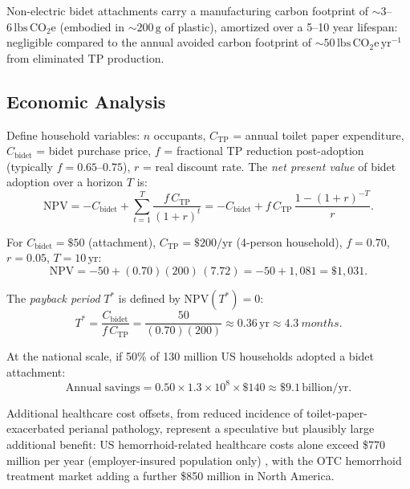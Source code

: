 \documentclass[aps,prfluids,reprint,amsmath,amssymb,floatfix]{revtex4-2}
\begin{document}
Non-electric bidet attachments carry a manufacturing carbon footprint of
$\sim\!3$--$6\,\mathrm{lbs\,CO_2e}$ (embodied in $\sim\!200\,\mathrm{g}$
of plastic), amortized over a 5--10 year lifespan: negligible compared to
the annual avoided carbon footprint of $\sim\!50\,\mathrm{lbs\,CO_2e\,yr^{-1}}$
from eliminated TP production.

\subsection{Economic Analysis}

Define household variables: $n$ occupants, $C_\mathrm{TP}$ = annual toilet
paper expenditure, $C_\mathrm{bidet}$ = bidet purchase price, $f$ = fractional
TP reduction post-adoption (typically $f = 0.65$--$0.75$), $r$ = real discount
rate. The \emph{net present value} of bidet adoption over a horizon $T$ is:
\begin{equation}
    \mathrm{NPV} = -C_\mathrm{bidet} + \sum_{t=1}^{T}\frac{f\,C_\mathrm{TP}}{(1+r)^t}
    = -C_\mathrm{bidet} + f\,C_\mathrm{TP}\,\frac{1-(1+r)^{-T}}{r}.
    \label{eq:npv}
\end{equation}

For $C_\mathrm{bidet} = \$50$ (attachment), $C_\mathrm{TP} = \$200/\mathrm{yr}$
(4-person household), $f = 0.70$, $r = 0.05$, $T = 10\,\mathrm{yr}$:
\begin{equation}
    \mathrm{NPV} = -50 + (0.70)(200)\,(7.72) = -50 + 1{,}081 = \$1{,}031.
    \label{eq:npvval}
\end{equation}

The \emph{payback period} $T^*$ is defined by $\mathrm{NPV}(T^*) = 0$:
\begin{equation}
    T^* = \frac{C_\mathrm{bidet}}{f\,C_\mathrm{TP}}
    = \frac{50}{(0.70)(200)} \approx 0.36\,\mathrm{yr} \approx
    \SI{4.3}{months}.
    \label{eq:payback}
\end{equation}

At the national scale, if 50\% of 130 million US households adopted a
bidet attachment:
\begin{equation}
    \mathrm{Annual\;savings} = 0.50 \times 1.3 \times 10^8 \times \$140
    \approx \$9.1\,\mathrm{billion/yr}.
\end{equation}

Additional healthcare cost offsets, from reduced incidence of toilet-paper-exacerbated
perianal pathology, represent a speculative but plausibly large additional
benefit: US hemorrhoid-related healthcare costs alone exceed \$770 million
per year (employer-insured population only) \citep{Peery2014}, with the OTC
hemorrhoid treatment market adding a further \$850 million in North America.
\end{document}
